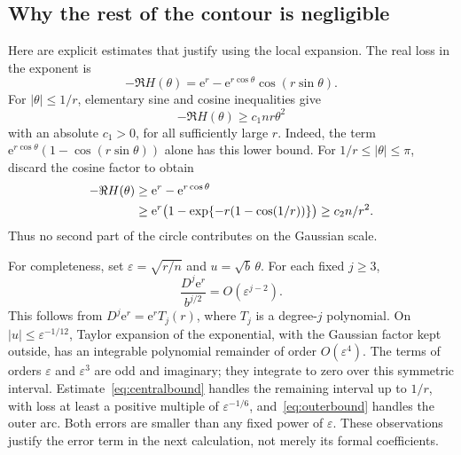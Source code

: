 \documentclass[11pt,a4paper]{article}
\numberwithin{equation}{section}
\theoremstyle{remark}
\newcommand{\e}{\mathrm e}
\begin{document}
\subsection{Why the rest of the contour is negligible}
Here are explicit estimates that justify using the local expansion.
The real loss in the exponent is
\begin{equation}\label{eq:loss}
 -\Re H(\theta)
 =\e^r-\e^{r\cos\theta}\cos(r\sin\theta).
\end{equation}
For $|\theta|\le1/r$, elementary sine and cosine inequalities give
\begin{equation}\label{eq:centralbound}
 -\Re H(\theta)\ge c_1nr\theta^2
\end{equation}
with an absolute $c_1>0$, for all sufficiently large $r$. Indeed, the term
$\e^{r\cos\theta}(1-\cos(r\sin\theta))$ alone has this lower bound.
For $1/r\le|\theta|\le\pi$, discard the cosine factor to obtain
\begin{align}
 -\Re H(\theta)
 &\ge\e^r-\e^{r\cos\theta}\notag\\
 &\ge\e^r\bigl(1-\exp\{-r(1-\cos(1/r))\}\bigr)
 \ge c_2 n/r^2.\label{eq:outerbound}
\end{align}
Thus no second part of the circle contributes on the Gaussian scale.

For completeness, set $\varepsilon=\sqrt{r/n}$ and $u=\sqrt b\,\theta$.
For each fixed $j\ge3$,
\begin{equation}\label{eq:standardized}
 \frac{D^j\e^r}{b^{j/2}}=O(\varepsilon^{j-2}).
\end{equation}
This follows from $D^j\e^r=\e^r T_j(r)$, where $T_j$ is a degree-$j$
polynomial. On $|u|\le\varepsilon^{-1/12}$, Taylor expansion of the
exponential, with the Gaussian factor kept outside, has an integrable
polynomial remainder of order $O(\varepsilon^4)$. The terms of orders
$\varepsilon$ and $\varepsilon^3$ are odd and imaginary; they integrate to
zero over this symmetric interval. Estimate~\eqref{eq:centralbound}
handles the remaining interval up to $1/r$, with loss at least a positive
multiple of $\varepsilon^{-1/6}$, and~\eqref{eq:outerbound} handles the
outer arc. Both errors are smaller than any fixed power of $\varepsilon$.
These observations justify the error term in the next calculation, not
merely its formal coefficients.
\end{document}

